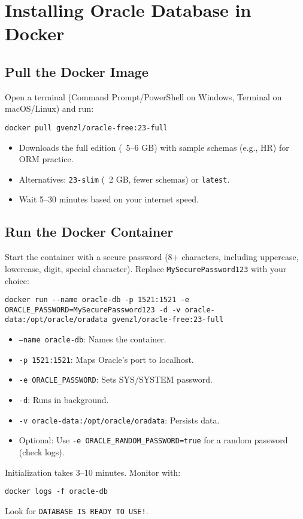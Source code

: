 \documentclass[a4paper,12pt]{article}
\begin{document}
\section{Installing Oracle Database in Docker}
\subsection{Pull the Docker Image}
Open a terminal (Command Prompt/PowerShell on Windows, Terminal on macOS/Linux) and run:
\begin{lstlisting}
docker pull gvenzl/oracle-free:23-full
\end{lstlisting}
\begin{itemize}
  \item Downloads the full edition (~5--6 GB) with sample schemas (e.g., HR) for ORM practice.
  \item Alternatives: \texttt{23-slim} (~2 GB, fewer schemas) or \texttt{latest}.
  \item Wait 5--30 minutes based on your internet speed.
\end{itemize}

\subsection{Run the Docker Container}
Start the container with a secure password (8+ characters, including uppercase, lowercase, digit, special character). Replace \texttt{MySecurePassword123} with your choice:
\begin{lstlisting}
docker run --name oracle-db -p 1521:1521 -e ORACLE_PASSWORD=MySecurePassword123 -d -v oracle-data:/opt/oracle/oradata gvenzl/oracle-free:23-full
\end{lstlisting}
\begin{itemize}
  \item \texttt{--name oracle-db}: Names the container.
  \item \texttt{-p 1521:1521}: Maps Oracle’s port to localhost.
  \item \texttt{-e ORACLE_PASSWORD}: Sets SYS/SYSTEM password.
  \item \texttt{-d}: Runs in background.
  \item \texttt{-v oracle-data:/opt/oracle/oradata}: Persists data.
  \item Optional: Use \texttt{-e ORACLE_RANDOM_PASSWORD=true} for a random password (check logs).
\end{itemize}
Initialization takes 3--10 minutes. Monitor with:
\begin{lstlisting}
docker logs -f oracle-db
\end{lstlisting}
Look for \texttt{DATABASE IS READY TO USE!}.
\end{document}
